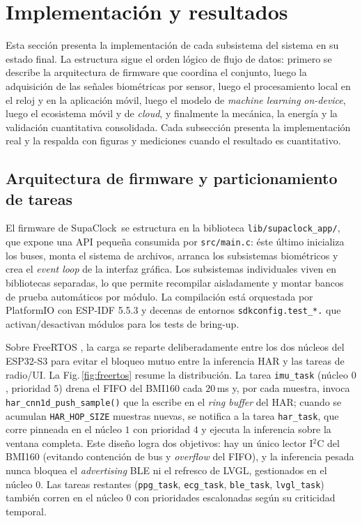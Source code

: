 \documentclass[letterpaper,11pt]{article}
\newcommand{\rfigura}[1]{Fig.\,\ref{#1}}
\newcommand{\NombreProyecto}{SupaClock}
\begin{document}
\newpage

\section{Implementaci\'on y resultados}\label{sec:impl}

Esta secci\'on presenta la implementaci\'on de cada subsistema del sistema en su estado final. La estructura sigue el orden l\'ogico de flujo de datos: primero se describe la arquitectura de firmware que coordina el conjunto, luego la adquisici\'on de las se\~nales biom\'etricas por sensor, luego el procesamiento local en el reloj y en la aplicaci\'on m\'ovil, luego el modelo de \textit{machine learning} \textit{on-device}, luego el ecosistema m\'ovil y de \textit{cloud}, y finalmente la mec\'anica, la energ\'ia y la validaci\'on cuantitativa consolidada. Cada subsecci\'on presenta la implementaci\'on real y la respalda con figuras y mediciones cuando el resultado es cuantitativo.

\subsection{Arquitectura de firmware y particionamiento de tareas}

El firmware de \NombreProyecto\ se estructura en la biblioteca \texttt{lib/supaclock\_app/}, que expone una API pequ\-e\-\~na consumida por \texttt{src/main.c}: \'este \'ultimo inicializa los buses, monta el sistema de archivos, arranca los subsistemas biom\'etricos y crea el \textit{event loop} de la interfaz gr\'afica. Los subsistemas individuales viven en bibliotecas separadas, lo que permite recompilar aisladamente y montar bancos de prueba autom\'aticos por m\'odulo. La compilaci\'on est\'a orquestada por PlatformIO con ESP-IDF 5.5.3 y decenas de entornos \texttt{sdkconfig.test\_*.} que activan/desactivan m\'odulos para los tests de bring-up.

Sobre FreeRTOS \cite{freertos_ref}, la carga se reparte deliberadamente entre los dos n\'ucleos del ESP32-S3 para evitar el bloqueo mutuo entre la inferencia HAR y las tareas de radio/UI. La \rfigura{fig:freertos} resume la distribuci\'on. La tarea \texttt{imu\_task} (n\'ucleo $0$, prioridad $5$) drena el FIFO del BMI160 cada $20$\,ms y, por cada muestra, invoca \texttt{har\_cnn1d\_push\_sample()} que la escribe en el \textit{ring buffer} del HAR; cuando se acumulan \texttt{HAR\_HOP\_SIZE} muestras nuevas, se notifica a la tarea \texttt{har\_task}, que corre pinneada en el n\'ucleo $1$ con prioridad $4$ y ejecuta la inferencia sobre la ventana completa. Este dise\~no logra dos objetivos: hay un \'unico lector I$^2$C del BMI160 (evitando contenci\'on de bus y \textit{overflow} del FIFO), y la inferencia pesada nunca bloquea el \textit{advertising} BLE ni el refresco de LVGL, gestionados en el n\'ucleo $0$. Las tareas restantes (\texttt{ppg\_task}, \texttt{ecg\_task}, \texttt{ble\_task}, \texttt{lvgl\_task}) tambi\'en corren en el n\'ucleo $0$ con prioridades escalonadas seg\'un su criticidad temporal.
\end{document}
